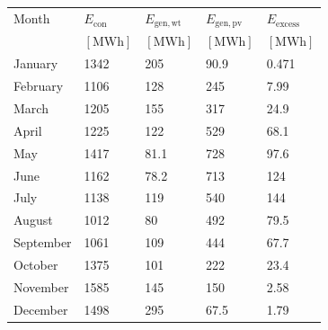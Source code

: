 \begin{table}
\label{tab: MonthlyEnergy}
\begin{tabular}{lllll}
\toprule
Month & $E_{\mathrm{con}}$ & $E_{\mathrm{gen,wt}}$ & $E_{\mathrm{gen,pv}}$ & $E_{\mathrm{excess}}$ \\
 & $\left[\mathrm{MWh}\right]$ & $\left[\mathrm{MWh}\right]$ & $\left[\mathrm{MWh}\right]$ & $\left[\mathrm{MWh}\right]$ \\
\midrule
January & 1342 & 205 & 90.9 & 0.471 \\
February & 1106 & 128 & 245 & 7.99 \\
March & 1205 & 155 & 317 & 24.9 \\
April & 1225 & 122 & 529 & 68.1 \\
May & 1417 & 81.1 & 728 & 97.6 \\
June & 1162 & 78.2 & 713 & 124 \\
July & 1138 & 119 & 540 & 144 \\
August & 1012 & 80 & 492 & 79.5 \\
September & 1061 & 109 & 444 & 67.7 \\
October & 1375 & 101 & 222 & 23.4 \\
November & 1585 & 145 & 150 & 2.58 \\
December & 1498 & 295 & 67.5 & 1.79 \\
\bottomrule
\end{tabular}
\end{table}
